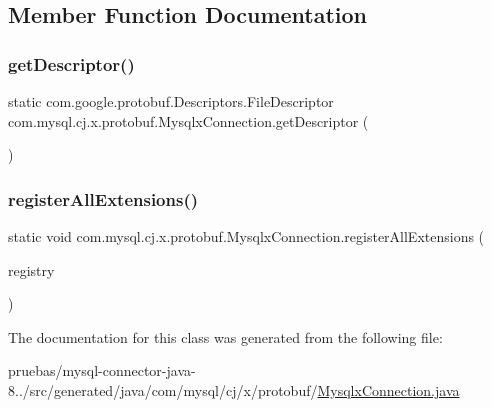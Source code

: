 \subsection{Member Function Documentation}
\mbox{\label{classcom_1_1mysql_1_1cj_1_1x_1_1protobuf_1_1_mysqlx_connection_af44fd15a800014c0f9290ee45f5fc6ce}} 
\subsubsection{\texorpdfstring{get\+Descriptor()}{getDescriptor()}}
{\footnotesize\ttfamily static com.\+google.\+protobuf.\+Descriptors.\+File\+Descriptor com.\+mysql.\+cj.\+x.\+protobuf.\+Mysqlx\+Connection.\+get\+Descriptor (\begin{DoxyParamCaption}{ }\end{DoxyParamCaption})\hspace{0.3cm}{\ttfamily [static]}}

\mbox{\label{classcom_1_1mysql_1_1cj_1_1x_1_1protobuf_1_1_mysqlx_connection_a51f7a824fdb8a7d42f33dc31ef519a94}} 
\subsubsection{\texorpdfstring{register\+All\+Extensions()}{registerAllExtensions()}}
{\footnotesize\ttfamily static void com.\+mysql.\+cj.\+x.\+protobuf.\+Mysqlx\+Connection.\+register\+All\+Extensions (\begin{DoxyParamCaption}\item[{com.\+google.\+protobuf.\+Extension\+Registry}]{registry }\end{DoxyParamCaption})\hspace{0.3cm}{\ttfamily [static]}}



The documentation for this class was generated from the following file\+:\begin{DoxyCompactItemize}
\item 
pruebas/mysql-\/connector-\/java-\/8../src/generated/java/com/mysql/cj/x/protobuf/\mbox{\hyperlink{_mysqlx_connection_8java}{Mysqlx\+Connection.\+java}}\end{DoxyCompactItemize}
